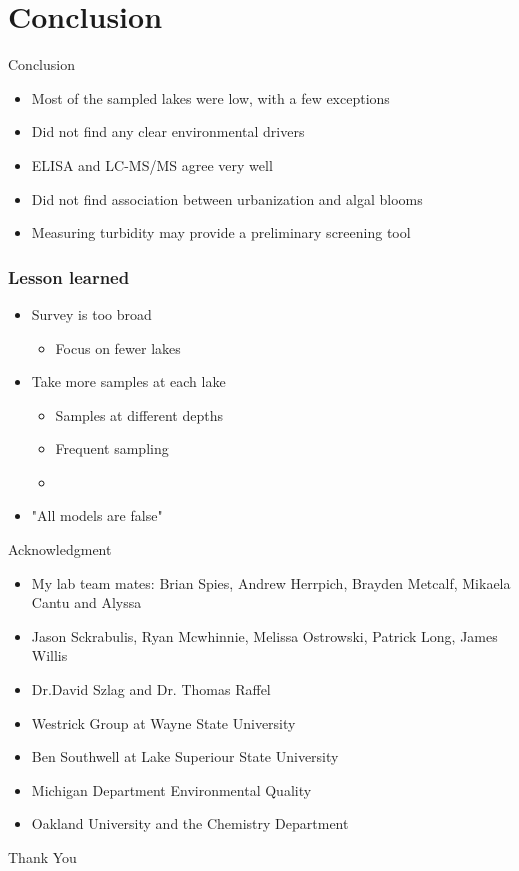 \section{Conclusion}
\begin{frame}{Conclusion}
	\begin{itemize}
		\item Most of the sampled lakes were low, with a few exceptions 
		\item Did not find any clear environmental drivers 
		\item ELISA and LC-MS/MS agree very well 
		\item Did not find association between urbanization and algal blooms 
		\item Measuring turbidity may provide a preliminary screening tool
	\end{itemize}

	
\end{frame}
\begin{frame}
	\frametitle{Lesson learned}

	\begin{itemize}
		\item Survey is too broad 
			\begin{itemize}
				\item Focus on fewer lakes
			\end{itemize}
		\item Take more samples at each lake 
			\begin{itemize}
				\item Samples at different depths 
				\item Frequent sampling 
				\item 
			\end{itemize}
		\item "All models are false"
	\end{itemize}

	

\end{frame}


\begin{frame}{Acknowledgment}

	\begin{itemize} 
		\item My lab team mates: Brian Spies, Andrew Herrpich, Brayden Metcalf, Mikaela Cantu and Alyssa
		\item Jason Sckrabulis, Ryan Mcwhinnie, Melissa Ostrowski, Patrick Long, James Willis
		\item Dr.David Szlag and Dr. Thomas Raffel
		\item Westrick Group at Wayne State University
		\item Ben Southwell at Lake Superiour State University
		\item Michigan Department Environmental Quality
		\item Oakland University and the Chemistry Department
	\end{itemize}
\end{frame}
\begin{frame}{}
\begin{center}
Thank You
\end{center}
\end{frame}
